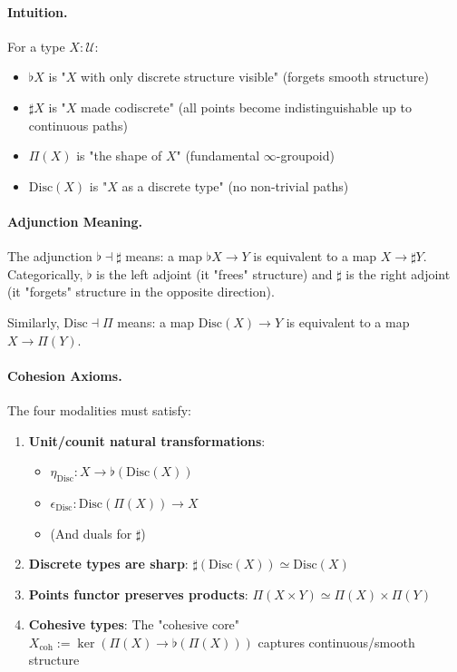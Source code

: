 \documentclass[11pt]{article}
\theoremstyle{definition}
\begin{document}
\paragraph{Intuition.}

For a type $X : \mathcal{U}$:
\begin{itemize}
\item $\flat X$ is "$X$ with only discrete structure visible" (forgets smooth structure)
\item $\sharp X$ is "$X$ made codiscrete" (all points become indistinguishable up to continuous paths)
\item $\Pi(X)$ is "the shape of $X$" (fundamental $\infty$-groupoid)
\item $\text{Disc}(X)$ is "$X$ as a discrete type" (no non-trivial paths)
\end{itemize}

\paragraph{Adjunction Meaning.}

The adjunction $\flat \dashv \sharp$ means: a map $\flat X \to Y$ is equivalent to a map $X \to \sharp Y$. Categorically, $\flat$ is the left adjoint (it "frees" structure) and $\sharp$ is the right adjoint (it "forgets" structure in the opposite direction).

Similarly, $\text{Disc} \dashv \Pi$ means: a map $\text{Disc}(X) \to Y$ is equivalent to a map $X \to \Pi(Y)$.

\paragraph{Cohesion Axioms.}

The four modalities must satisfy:
\begin{enumerate}
\item \textbf{Unit/counit natural transformations}: 
\begin{itemize}
\item $\eta_{\text{Disc}} : X \to \flat(\text{Disc}(X))$
\item $\epsilon_{\text{Disc}} : \text{Disc}(\Pi(X)) \to X$
\item (And duals for $\sharp$)
\end{itemize}

\item \textbf{Discrete types are sharp}: $\sharp(\text{Disc}(X)) \simeq \text{Disc}(X)$

\item \textbf{Points functor preserves products}: $\Pi(X \times Y) \simeq \Pi(X) \times \Pi(Y)$

\item \textbf{Cohesive types}: The "cohesive core" $X_{\text{coh}} := \ker(\Pi(X) \to \flat(\Pi(X)))$ captures continuous/smooth structure
\end{enumerate}
\end{document}
